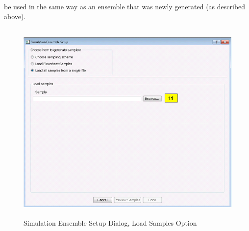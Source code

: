 \begin{enumerate}
	be used in the same way as an ensemble that was newly generated (as
	described above).
	\begin{figure}[H]
		\centering \includegraphics[width=6.5in,height=4in,keepaspectratio]{Chapt_uq/figs/overview/8_SimSetupLoad2}
		\caption{Simulation Ensemble Setup Dialog, Load Samples Option}
		\label{fig:uq_sim_loadsample}
		\end{figure}
		\label{itm:uq_sim_last}
\end{enumerate}

